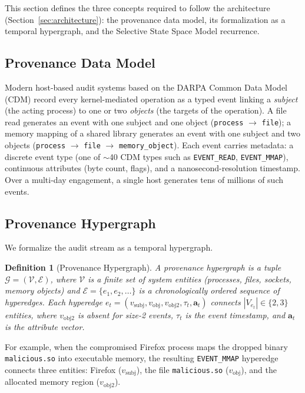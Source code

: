 \documentclass[letterpaper,twocolumn,10pt]{article}
\newtheorem{definition}{Definition}
\begin{document}
This section defines the three concepts required to follow the architecture (Section~\ref{sec:architecture}): the provenance data model, its formalization as a temporal hypergraph, and the Selective State Space Model recurrence.

\subsection{Provenance Data Model}
\label{sec:provenance}

Modern host-based audit systems based on the DARPA Common Data Model (CDM) record every kernel-mediated operation as a typed event linking a \emph{subject} (the acting process) to one or two \emph{objects} (the targets of the operation). A file read generates an event with one subject and one object (\texttt{process} $\to$ \texttt{file}); a memory mapping of a shared library generates an event with one subject and two objects (\texttt{process} $\to$ \texttt{file} $\to$ \texttt{memory\_object}). Each event carries metadata: a discrete event type (one of $\sim$40 CDM types such as \texttt{EVENT\_READ}, \texttt{EVENT\_MMAP}), continuous attributes (byte count, flags), and a nanosecond-resolution timestamp. Over a multi-day engagement, a single host generates tens of millions of such events.

\subsection{Provenance Hypergraph}
\label{sec:hypergraph}

We formalize the audit stream as a temporal hypergraph.

\begin{definition}[Provenance Hypergraph]
\label{def:hypergraph}
A \emph{provenance hypergraph} is a tuple $\mathcal{G} = (\mathcal{V}, \mathcal{E})$, where $\mathcal{V}$ is a finite set of system entities (processes, files, sockets, memory objects) and $\mathcal{E} = \{e_1, e_2, \dots\}$ is a chronologically ordered sequence of hyperedges. Each hyperedge $e_t = (v_{\text{subj}}, v_{\text{obj}}, v_{\text{obj2}}, \tau_t, \mathbf{a}_t)$ connects $|V_{e_t}| \in \{2, 3\}$ entities, where $v_{\text{obj2}}$ is absent for size-2 events, $\tau_t$ is the event timestamp, and $\mathbf{a}_t$ is the attribute vector.
\end{definition}

\noindent For example, when the compromised Firefox process maps the dropped binary \texttt{malicious.so} into executable memory, the resulting \texttt{EVENT\_MMAP} hyperedge connects three entities: Firefox ($v_{\text{subj}}$), the file \texttt{malicious.so} ($v_{\text{obj}}$), and the allocated memory region ($v_{\text{obj2}}$).
\end{document}
